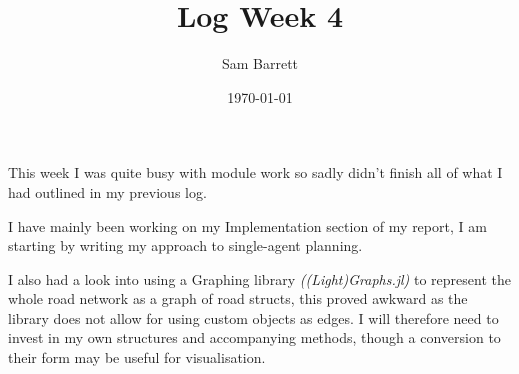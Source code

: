 \documentclass[11pt]{article}
\author{Sam Barrett}
\date{\today}
\title{Log Week 4}
\begin{document}
\maketitle
This week I was quite busy with module work so sadly didn't finish all of what I had outlined in my previous log.

I have mainly been working on my Implementation section of my report, I am starting by writing my approach to single-agent planning.

I also had a look into using a Graphing library \emph{((Light)Graphs.jl)} to represent the whole road network as a graph of road structs, this proved awkward as the library does not allow for using custom objects as edges. I will therefore need to invest in my own structures and accompanying methods, though a conversion to their form may be useful for visualisation.
\end{document}
